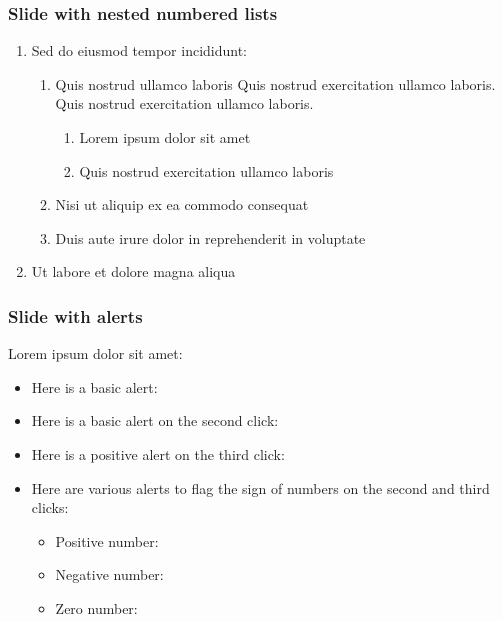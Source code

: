 \documentclass[11pt, aspectratio=169, xcolor={dvipsnames}, usepdftitle=false]{beamer}
\begin{document}
\begin{frame}
\frametitle{Slide with nested numbered lists}
\begin{enumerate}
\item Sed do eiusmod tempor incididunt:
\begin{enumerate}
\item Quis nostrud ullamco laboris Quis nostrud exercitation ullamco laboris. Quis nostrud exercitation ullamco laboris. 
\begin{enumerate}
\item Lorem ipsum dolor sit amet
\item Quis nostrud exercitation ullamco laboris
\end{enumerate}
\item Nisi ut aliquip ex ea commodo consequat
\item Duis aute irure dolor in reprehenderit in voluptate
\end{enumerate}
\item Ut labore et dolore magna aliqua
\end{enumerate}
\end{frame}

\begin{frame}
\frametitle{Slide with alerts}
Lorem ipsum dolor sit amet:
\begin{itemize}
\item Here is a basic alert: 
\item Here is a basic alert on the second click: 
\item Here is a positive alert on the third click: 
\item Here are various alerts to flag the sign of numbers on the second and third clicks:
\begin{itemize}
\item Positive number: 
\item Negative number: 
\item Zero number: 
\end{itemize}
\end{itemize}
\end{frame}

\begin{frame}
\end{frame}
\end{document}
